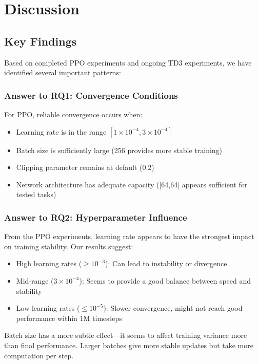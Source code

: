 \documentclass[12pt,a4paper]{report}
\begin{document}
\chapter{Discussion}

\section{Key Findings}

Based on completed PPO experiments and ongoing TD3 experiments, we have identified several important patterns:

\subsection{Answer to RQ1: Convergence Conditions}

For PPO, reliable convergence occurs when:
\begin{itemize}
    \item Learning rate is in the range $[1 \times 10^{-4}, 3 \times 10^{-4}]$
    \item Batch size is sufficiently large (256 provides more stable training)
    \item Clipping parameter remains at default (0.2)
    \item Network architecture has adequate capacity ([64,64] appears sufficient for tested tasks)
\end{itemize}



\subsection{Answer to RQ2: Hyperparameter Influence}

From the PPO experiments, learning rate appears to have the strongest impact on training stability. Our results suggest:
\begin{itemize}
    \item High learning rates ($\geq 10^{-3}$): Can lead to instability or divergence
    \item Mid-range ($3 \times 10^{-4}$): Seems to provide a good balance between speed and stability
    \item Low learning rates ($\leq 10^{-5}$): Slower convergence, might not reach good performance within 1M timesteps
\end{itemize}

Batch size has a more subtle effect—it seems to affect training variance more than final performance. Larger batches give more stable updates but take more computation per step.
\end{document}
